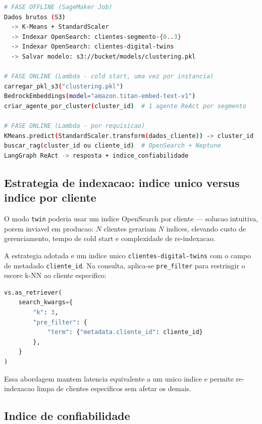 \begin{lstlisting}[language=bash,
  caption={Visao esquematica das duas fases do pipeline.},
  label={lst:duas_fases}]
# FASE OFFLINE (SageMaker Job)
Dados brutos (S3)
  -> K-Means + StandardScaler
  -> Indexar OpenSearch: clientes-segmento-{0..3}
  -> Indexar OpenSearch: clientes-digital-twins
  -> Salvar modelo: s3://bucket/models/clustering.pkl

# FASE ONLINE (Lambda - cold start, uma vez por instancia)
carregar_pkl_s3("clustering.pkl")
BedrockEmbeddings(model="amazon.titan-embed-text-v1")
criar_agente_por_cluster(cluster_id)  # 1 agente ReAct por segmento

# FASE ONLINE (Lambda - por requisicao)
KMeans.predict(StandardScaler.transform(dados_cliente)) -> cluster_id
buscar_rag(cluster_id ou cliente_id)  # OpenSearch + Neptune
LangGraph ReAct -> resposta + indice_confiabilidade
\end{lstlisting}

\subsection{Estrategia de indexacao: indice unico versus indice por cliente}

O modo \texttt{twin} poderia usar um indice OpenSearch
por cliente --- solucao intuitiva, porem inviavel em producao:
$N$ clientes gerariam $N$ indices, elevando custo de gerenciamento,
tempo de cold start e complexidade de re-indexacao.

A estrategia adotada e um indice unico \texttt{clientes-digital-twins}
com o campo de metadado \texttt{cliente\_id}. Na consulta, aplica-se
\texttt{pre\_filter} para restringir o escore k-NN ao cliente especifico:

\begin{lstlisting}[language=Python,
  caption={Retriever com pre\_filter por cliente\_id no indice de twins.},
  label={lst:prefilter_twin}]
vs.as_retriever(
    search_kwargs={
        "k": 3,
        "pre_filter": {
            "term": {"metadata.cliente_id": cliente_id}
        },
    }
)
\end{lstlisting}

Essa abordagem mantem latencia equivalente a um unico indice e
permite re-indexacao limpa de clientes especificos sem afetar os demais.

\subsection{Indice de confiabilidade}

